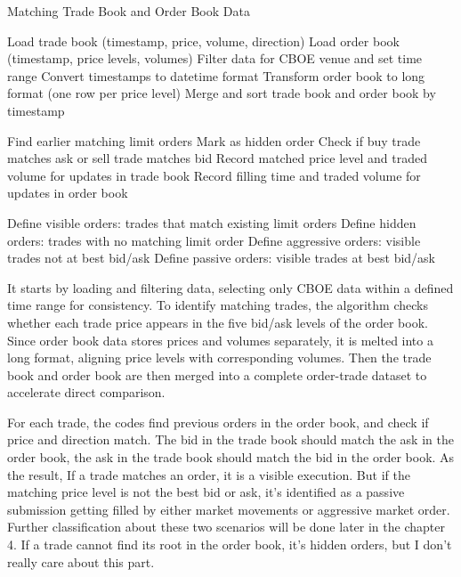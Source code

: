 \begin{algorithm}
    \caption{Matching Trade Book and Order Book Data}
    \label{alg:trade_order_matching}
    \begin{algorithmic}[1]
        \State Load trade book (timestamp, price, volume, direction)
        \State Load order book (timestamp, price levels, volumes)
        \State Filter data for CBOE venue and set time range
        \State Convert timestamps to datetime format
        \State Transform order book to long format (one row per price level)
        \State Merge and sort trade book and order book by timestamp
    
            \State Find earlier matching limit orders
                \State Mark as hidden order
            \Else
                \State Check if buy trade matches ask or sell trade matches bid
                \State Record matched price level and traded volume for updates in trade book
                \State Record filling time and traded volume for updates in order book
            \EndIf
        \EndFor
    
        \State Define visible orders: trades that match existing limit orders
        \State Define hidden orders: trades with no matching limit order
        \State Define aggressive orders: visible trades not at best bid/ask
        \State Define passive orders: visible trades at best bid/ask
    
    \end{algorithmic}
\end{algorithm}

It starts by loading and filtering data, selecting only CBOE data within a defined time range for consistency. To identify matching trades, the algorithm checks whether each trade price appears in the five bid/ask levels of the order book. Since order book data stores prices and volumes separately, it is melted into a long format, aligning price levels with corresponding volumes. Then the trade book and order book are then merged into a complete order-trade dataset to accelerate direct comparison.

For each trade, the codes find previous orders in the order book, and check if price and direction match. The bid in the trade book should match the ask in the order book, the ask in the trade book should match the bid in the order book. As the result, If a trade matches an order, it is a visible execution. But if the matching price level is not the best bid or ask, it's identified as a passive submission getting filled by either market movements or aggressive market order. Further classification about these two scenarios will be done later in the chapter 4. If a trade cannot find its root in the order book, it's hidden orders, but I don't really care about this part.

